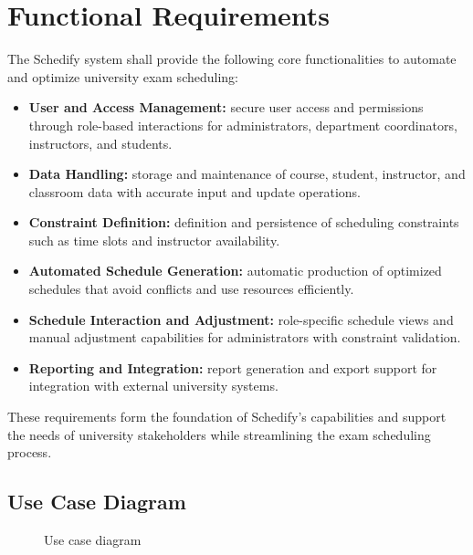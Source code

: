 \documentclass[11pt]{report}
\newcommand{\diagramfigure}[3]{%
\begin{figure}[H]
\centering

\caption{#2}
\end{figure}
}
\begin{document}
\section{Functional Requirements}
The Schedify system shall provide the following core functionalities to automate and optimize university exam scheduling:
\begin{itemize}
\item \textbf{User and Access Management:} secure user access and permissions through role-based interactions for administrators, department coordinators, instructors, and students.
\item \textbf{Data Handling:} storage and maintenance of course, student, instructor, and classroom data with accurate input and update operations.
\item \textbf{Constraint Definition:} definition and persistence of scheduling constraints such as time slots and instructor availability.
\item \textbf{Automated Schedule Generation:} automatic production of optimized schedules that avoid conflicts and use resources efficiently.
\item \textbf{Schedule Interaction and Adjustment:} role-specific schedule views and manual adjustment capabilities for administrators with constraint validation.
\item \textbf{Reporting and Integration:} report generation and export support for integration with external university systems.
\end{itemize}

These requirements form the foundation of Schedify's capabilities and support the needs of university stakeholders while streamlining the exam scheduling process.

\subsection{Use Case Diagram}
\diagramfigure{01_use_case_diagram}{Use case diagram}{0.95}
\end{document}
